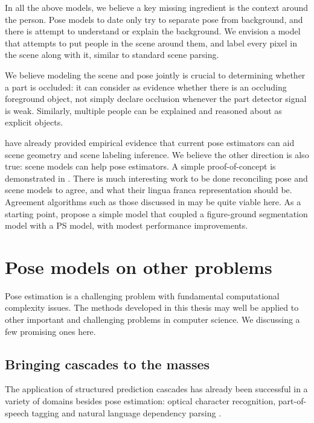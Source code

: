 In all the above models, we believe a key missing ingredient is the context 
around the person.  Pose models to date only try to separate pose from 
background, and there is attempt to understand or explain the background.  We 
envision a model that attempts to put people in the scene around them, and 
label every pixel in the scene along with it, similar to standard scene 
parsing.  

We believe modeling the scene and pose jointly is crucial to determining 
whether a part is occluded: it can consider as evidence whether there is an 
occluding foreground object, not simply declare occlusion whenever the part 
detector signal is weak. Similarly, multiple people can be explained and 
reasoned about as explicit objects. 

\citet{gupta11,delaitre12} have already provided empirical evidence that 
current pose estimators can aid scene geometry and scene labeling inference.  
We believe the other direction is also true: scene models can help pose 
estimators.  A simple proof-of-concept is demonstrated in .  
There is much interesting work to be done reconciling pose and scene models to 
agree, and what their lingua franca representation should be.  Agreement 
algorithms such as those discussed in  may be quite viable 
here.  As a starting point, \cite{koller11} propose a simple model that coupled 
a figure-ground segmentation model with a PS model, with modest performance 
improvements.
 
\section{Pose models on other problems}

Pose estimation is a challenging problem with fundamental computational 
complexity issues.  The methods developed in this thesis may well be applied to 
other important and challenging problems in computer science.  We discussing a 
few promising ones here.

\subsection{Bringing cascades to the masses}
The application of structured prediction cascades has already been successful 
in a variety of domains besides pose estimation: optical character recognition, 
part-of-speech tagging \citep{cascades-jmlr} and natural language dependency 
parsing \citep{slav-naacl}.

